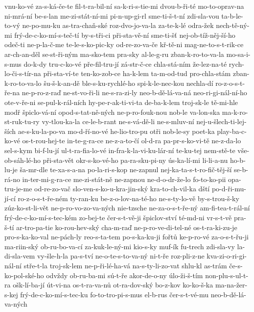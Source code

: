 vnu-ko-vé
za-s-ká-če-te
fil-t-ra-bil-ní
sa-k-ri-s-tie-mi
dvou-b-ři-té
mo-to-oprav-na
ni-mrá-ní
be-s-lan
me-zi-stát-ní-mi
pi-n-up-gi-rl
sme-ti-š-t-ní
zdi-sla-vou
ta-b-le-to-vý
ne-po-mu-ku
as-tra-chaň-ské
roz-dvo-jo-va-la
za-te-k-lé
odra-žek
nech-tě-ný-mi
frý-de-c-ko-mí-s-teč-tí
by-s-tři-ci
při-sta-vě-ní
sme-ti-šť
nej-ob-tíž-něj-ší-ho
odeč-ti
ne-p-la-č-me
te-le-s-ko-pic-ky
od-re-zo-va-če
kř-tě-ni
mag-ne-to-s-t-rik-ce
ar-ch-an-děl
se-st-ři-ným
ma-sko-tem
pra-sky
al-le-g-ru
zban-k-ro-to-va-la
mo-sa-i-s-mus
do-k-dy
tru-c-ko-vé
pře-fil-tru-jí
zá-str-č-ce
chla-stá-ním
že-lez-na-té
rych-lo-či-s-tír-na
při-sta-ví-te
ten-ko-zob-ce
ha-k-lem
ta-m-od-tud
pro-chla-stám
zban-k-ro-to-va-lo
šu-š-k-an-dě
ble-s-ku-rychlé-ho
spi-k-le-nec-kou
nechla-dí
ro-z-o-s-t-ře-na
ne-p-ro-z-raď
ne-st-vo-ři-li
ne-s-ra-zi-ly
neo-b-dě-lá-va-ná
neo-ri-gi-nál-ní-ho
ote-v-ře-ni
se-pul-k-rál-ních
hy-pe-r-ak-ti-vi-ta
de-ba-k-lem
troj-sk-le
tě-mi-hle
modř
špiclo-vá-ní
opod-s-tat-ně-ných
ne-p-ro-fouk-nou
nob-le
va-lon-ska
ma-k-ro-st-ruk-tu-ry
vy-tlou-ka-la
ce-le-b-rant
ne-s-vá-dě-li
ne-s-mluv-ní
nej-u-šlech-ti-lej-ších
ae-s-ku-la-po-va
mo-d-ří-no-vé
he-lio-tro-pu
otři
nob-le-sy
poet-ka
play-ba-c-ko-vé
os-t-rou-hej-te
in-te-g-ra-ce
ne-z-a-to-čí
ol-d-ra
pa-pr-s-ko-vi-tě
ne-z-da-lo
sel-s-kym
bi-f-lu-jí
ul-t-ra-fia-lo-vé
in-fra-k-la-vi-ku-lár-ní
te-ku-tej
nem-stě-te
vše-ob-sáh-lé-ho
při-sta-vět
okr-s-ko-vé-ho
pa-ra-sku-pi-ny
ús-ka-lí-mi
li-li-a-nu
ho-b-lu-je
ša-mr-dle
te-xa-s-a-na
po-la-ri-s-kop
ne-zapnul
nej-ka-ta-s-t-ro-fič-těj-ší
se-b-rá-no
in-ter-mi-g-ra-ce
me-zi-stát-ně
ne-zapnou
ne-d-o-dr-že-lo
fo-to-ko-pii
opa-tru-je-me
od-re-zo-vač
slo-ven-s-ko-u-kra-jin-ský
kra-to-ch-vil-ka
dští
po-d-ři-mu-jí-cí
ro-z-o-s-t-ře-ném
ty-ran-ku
be-z-o-lov-na-té-ho
ne-s-ty-lo-vě
by-s-trou-š-ky
zúz-ko-st-li-vět
ne-p-ro-vo-zo-va-ných
nie-tzsche
ne-za-o-s-t-ře-ný
am-fi-tea-t-rál-ní
frý-de-c-ko-mí-s-tec-kém
zo-bej-te
čer-s-t-vě-ji
špiclov-ství
té-md-ni
vr-s-t-vě
pra-š-tí
ar-tro-pa-tie
ko-rou-hev-ský
cha-m-raď
ne-p-ro-ve-di-tel-né
os-t-ra-ki-zu-je
pro-s-ka-ko-val
ne-pách-ly
reo-s-ta-tem
po-s-ka-ku-ji
fořtů
ke-p-ro-vé
za-o-s-t-řu-ji
ma-riin-ský
ob-ru-bo-va-cí
za-kuk-le-ný-mi
kio-s-ky
muf-ík
fu-trech
zdi-sla-vy
la-di-sla-vem
vy-šle-h-la
pa-s-tví
ne-o-te-s-to-va-ný
ni-t-ře
roz-pli-z-ne
kva-zi-o-ri-gi-nál-ní
stře-t-la
troj-sk-lem
ne-p-ři-lé-ha-vá
na-s-ty-li-zo-vat
shlu-kl
as-trám
če-s-ko-pol-ské-ho
odvždy
ob-ru-ba-mi
sú-t-ře
akor-de-o-ny
úlo-ži-š-tím
non-plu-s-ul-t-ra
ošk-lí-ba-jí
út-vi-na
os-t-ra-va-nů
ot-ra-dov-ský
bo-z-kov
ko-ko-š-ka
ma-na-žer-s-kej
frý-de-c-ko-mí-s-tec-ku
fo-to-tro-pi-s-mus
el-b-rus
čer-s-t-vé-mu
neo-b-dě-lá-va-ných
